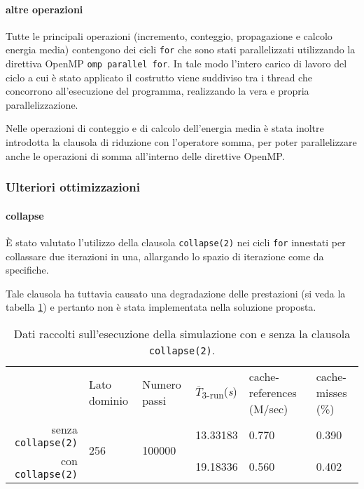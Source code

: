 \paragraph{altre operazioni}
Tutte le principali operazioni (incremento, conteggio, propagazione e calcolo
energia media) contengono dei cicli \texttt{for} che sono stati parallelizzati
utilizzando la direttiva OpenMP \texttt{omp parallel for}.  In tale modo
l'intero carico di lavoro del ciclo a cui è stato applicato il costrutto viene
suddiviso tra i thread che concorrono all'esecuzione del programma, realizzando
la vera e propria parallelizzazione.

Nelle operazioni di conteggio e di calcolo dell'energia media è stata inoltre
introdotta la clausola di riduzione con l'operatore somma, per poter
parallelizzare anche le operazioni di somma all'interno delle direttive OpenMP\@.

\subsubsection{Ulteriori ottimizzazioni}

\paragraph{collapse}

È stato valutato l'utilizzo della clausola \texttt{collapse(2)} nei cicli
\texttt{for} innestati per collassare due iterazioni in una, allargando lo
spazio di iterazione come da specifiche\cite{openmp2018reference}.

Tale clausola ha tuttavia causato una degradazione delle prestazioni (si veda la
tabella \ref{tab:collapse}) e pertanto non è stata implementata nella soluzione
proposta.

\begin{table}[ht]
\begin{tabularx}{\linewidth}{rXXXXX}
\cmidrule[\heavyrulewidth]{2-6}
& Lato dominio & Numero passi & $\overline{T}$\textsubscript{3-run}(\textit{s})
& cache-references (M/sec) & cache-misses (\%)\footnotemark{}\\
\cmidrule[\lightrulewidth]{2-6}
senza \texttt{collapse(2)} & \multirow{2}{*}{256} & \multirow{2}{*}{100000} &
   13.33183 & 0.770 & 0.390\\
\cmidrule{4-6}
   con \texttt{collapse(2)} &&& 19.18336 & 0.560 & 0.402\\
\cmidrule[\heavyrulewidth]{2-6}
\end{tabularx}
\caption{\label{tab:collapse}Dati raccolti sull'esecuzione della simulazione con
e senza la clausola \texttt{collapse(2)}.}
\end{table}

